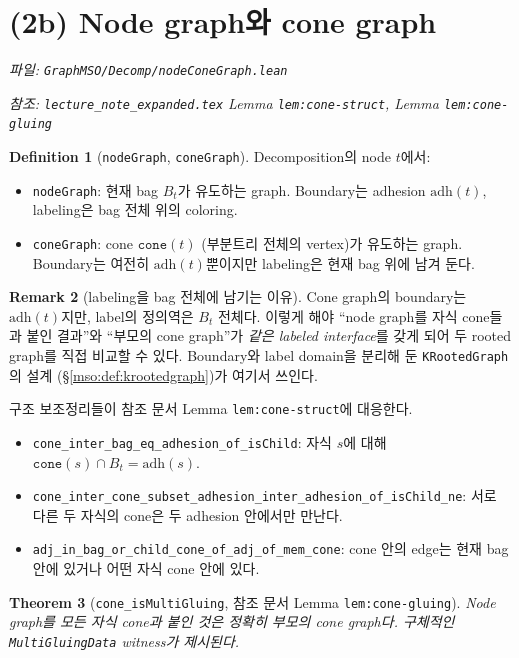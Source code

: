\documentclass[11pt]{article}
\theoremstyle{definition}
\newtheorem{definition}{Definition}[section]
\newtheorem{remark}[definition]{Remark}
\theoremstyle{plain}
\newtheorem{theorem}[definition]{Theorem}
\newcommand{\lean}[1]{\texttt{#1}}
\newcommand{\leanfile}[1]{\texttt{#1}}
\newcommand{\adh}{\mathrm{adh}}
\begin{document}
\section{(2b) Node graph와 cone graph}
\label{mso:sec:nodecone}

\emph{파일: \leanfile{GraphMSO/Decomp/nodeConeGraph.lean}}

\emph{참조: \leanfile{lecture\_note\_expanded.tex} Lemma \lean{lem:cone-struct},
Lemma \lean{lem:cone-gluing}}

\begin{definition}[\lean{nodeGraph}, \lean{coneGraph}]
\label{mso:def:nodeconegraph}
Decomposition의 node $t$에서:
\begin{itemize}
  \item \lean{nodeGraph}: 현재 bag $B_t$가 유도하는 graph. Boundary는 adhesion
    $\adh(t)$, labeling은 bag 전체 위의 coloring.
  \item \lean{coneGraph}: cone $\lean{cone}(t)$ (부분트리 전체의 vertex)가
    유도하는 graph. Boundary는 여전히 $\adh(t)$뿐이지만 labeling은 현재 bag
    위에 남겨 둔다.
\end{itemize}
\end{definition}

\begin{remark}[labeling을 bag 전체에 남기는 이유]
Cone graph의 boundary는 $\adh(t)$지만, label의 정의역은 $B_t$ 전체다.
이렇게 해야 ``node graph를 자식 cone들과 붙인 결과''와 ``부모의 cone graph''가
\emph{같은 labeled interface}를 갖게 되어 두 rooted graph를 직접 비교할 수
있다. Boundary와 label domain을 분리해 둔 \lean{KRootedGraph}의 설계
(\S\ref{mso:def:krootedgraph})가 여기서 쓰인다.
\end{remark}

구조 보조정리들이 참조 문서 Lemma \lean{lem:cone-struct}에 대응한다.
\begin{itemize}
  \item \lean{cone\_inter\_bag\_eq\_adhesion\_of\_isChild}:
    자식 $s$에 대해 $\lean{cone}(s) \cap B_t = \adh(s)$.
  \item \lean{cone\_inter\_cone\_subset\_adhesion\_inter\_adhesion\_of\_isChild\_ne}:
    서로 다른 두 자식의 cone은 두 adhesion 안에서만 만난다.
  \item \lean{adj\_in\_bag\_or\_child\_cone\_of\_adj\_of\_mem\_cone}: cone 안의
    edge는 현재 bag 안에 있거나 어떤 자식 cone 안에 있다.
\end{itemize}

\begin{theorem}[\lean{cone\_isMultiGluing}, 참조 문서 Lemma \lean{lem:cone-gluing}]
\label{mso:thm:conegluing}
Node graph를 모든 자식 cone과 붙인 것은 정확히 부모의 cone graph다. 구체적인
\lean{MultiGluingData} witness가 제시된다.
\end{theorem}
\end{document}
